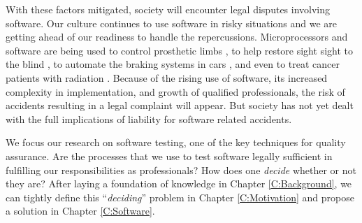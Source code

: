 With these factors mitigated, society will encounter legal disputes involving
software. Our culture continues to use software in risky situations and we are
getting ahead of our readiness to handle the repercussions. Microprocessors
and software are being used to control prosthetic limbs \cite{Graupe78}, to help
restore sight sight to the blind \cite{Fox95}, to automate the braking systems
in cars \cite{Hurtig94}, and even to treat cancer patients with radiation
\cite{Leveson93}. Because of the rising use of software, its increased
complexity in implementation, and growth of qualified professionals, the risk of
accidents resulting in a legal complaint will appear. But society has not yet
dealt with the full implications of liability for software related accidents.

We focus our research on software testing, one of the key techniques for quality
assurance. Are the processes that we use to test software legally sufficient in
fulfilling our responsibilities as professionals? How does one \textit{decide}
whether or not they are? After laying a foundation of knowledge in Chapter
\ref{C:Background}, we can tightly define this ``\textit{deciding}'' problem in
Chapter \ref{C:Motivation} and propose a solution in Chapter \ref{C:Software}.

